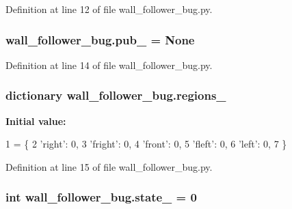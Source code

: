 Definition at line 12 of file wall\+\_\+follower\+\_\+bug.\+py.

\subsubsection[{\texorpdfstring{pub\+\_\+}{pub_}}]{\setlength{\rightskip}{0pt plus 5cm}wall\+\_\+follower\+\_\+bug.\+pub\+\_\+ = None}\hypertarget{namespacewall__follower__bug_af857c0a3244763f5e201f37452696767}{}\label{namespacewall__follower__bug_af857c0a3244763f5e201f37452696767}


Definition at line 14 of file wall\+\_\+follower\+\_\+bug.\+py.

\subsubsection[{\texorpdfstring{regions\+\_\+}{regions_}}]{\setlength{\rightskip}{0pt plus 5cm}dictionary wall\+\_\+follower\+\_\+bug.\+regions\+\_\+}\hypertarget{namespacewall__follower__bug_acb8af6367eac655a9899a840a3c89eae}{}\label{namespacewall__follower__bug_acb8af6367eac655a9899a840a3c89eae}
{\bfseries Initial value\+:}
\begin{DoxyCode}
1 = \{
2     \textcolor{stringliteral}{'right'}: 0,
3     \textcolor{stringliteral}{'fright'}: 0,
4     \textcolor{stringliteral}{'front'}: 0,
5     \textcolor{stringliteral}{'fleft'}: 0,
6     \textcolor{stringliteral}{'left'}: 0,
7 \}
\end{DoxyCode}


Definition at line 15 of file wall\+\_\+follower\+\_\+bug.\+py.

\subsubsection[{\texorpdfstring{state\+\_\+}{state_}}]{\setlength{\rightskip}{0pt plus 5cm}int wall\+\_\+follower\+\_\+bug.\+state\+\_\+ = 0}\hypertarget{namespacewall__follower__bug_a867cf414a3d42354a718497573927c3f}{}\label{namespacewall__follower__bug_a867cf414a3d42354a718497573927c3f}


